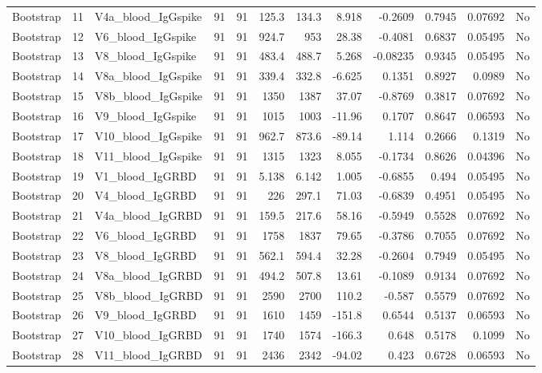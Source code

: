 \begin{longtable}{lrp{}rrrrrrrrl}
Bootstrap & 11 & V4a\_blood\_IgGspike & 91 & 91 & 125.3 & 134.3 & 8.918 & -0.2609 & 0.7945 & 0.07692 & No \\
Bootstrap & 12 & V6\_blood\_IgGspike & 91 & 91 & 924.7 & 953 & 28.38 & -0.4081 & 0.6837 & 0.05495 & No \\
Bootstrap & 13 & V8\_blood\_IgGspike & 91 & 91 & 483.4 & 488.7 & 5.268 & -0.08235 & 0.9345 & 0.05495 & No \\
Bootstrap & 14 & V8a\_blood\_IgGspike & 91 & 91 & 339.4 & 332.8 & -6.625 & 0.1351 & 0.8927 & 0.0989 & No \\
Bootstrap & 15 & V8b\_blood\_IgGspike & 91 & 91 & 1350 & 1387 & 37.07 & -0.8769 & 0.3817 & 0.07692 & No \\
Bootstrap & 16 & V9\_blood\_IgGspike & 91 & 91 & 1015 & 1003 & -11.96 & 0.1707 & 0.8647 & 0.06593 & No \\
Bootstrap & 17 & V10\_blood\_IgGspike & 91 & 91 & 962.7 & 873.6 & -89.14 & 1.114 & 0.2666 & 0.1319 & No \\
Bootstrap & 18 & V11\_blood\_IgGspike & 91 & 91 & 1315 & 1323 & 8.055 & -0.1734 & 0.8626 & 0.04396 & No \\
Bootstrap & 19 & V1\_blood\_IgGRBD & 91 & 91 & 5.138 & 6.142 & 1.005 & -0.6855 & 0.494 & 0.05495 & No \\
Bootstrap & 20 & V4\_blood\_IgGRBD & 91 & 91 & 226 & 297.1 & 71.03 & -0.6839 & 0.4951 & 0.05495 & No \\
Bootstrap & 21 & V4a\_blood\_IgGRBD & 91 & 91 & 159.5 & 217.6 & 58.16 & -0.5949 & 0.5528 & 0.07692 & No \\
Bootstrap & 22 & V6\_blood\_IgGRBD & 91 & 91 & 1758 & 1837 & 79.65 & -0.3786 & 0.7055 & 0.07692 & No \\
Bootstrap & 23 & V8\_blood\_IgGRBD & 91 & 91 & 562.1 & 594.4 & 32.28 & -0.2604 & 0.7949 & 0.05495 & No \\
Bootstrap & 24 & V8a\_blood\_IgGRBD & 91 & 91 & 494.2 & 507.8 & 13.61 & -0.1089 & 0.9134 & 0.07692 & No \\
Bootstrap & 25 & V8b\_blood\_IgGRBD & 91 & 91 & 2590 & 2700 & 110.2 & -0.587 & 0.5579 & 0.07692 & No \\
Bootstrap & 26 & V9\_blood\_IgGRBD & 91 & 91 & 1610 & 1459 & -151.8 & 0.6544 & 0.5137 & 0.06593 & No \\
Bootstrap & 27 & V10\_blood\_IgGRBD & 91 & 91 & 1740 & 1574 & -166.3 & 0.648 & 0.5178 & 0.1099 & No \\
Bootstrap & 28 & V11\_blood\_IgGRBD & 91 & 91 & 2436 & 2342 & -94.02 & 0.423 & 0.6728 & 0.06593 & No \\

\end{longtable}
